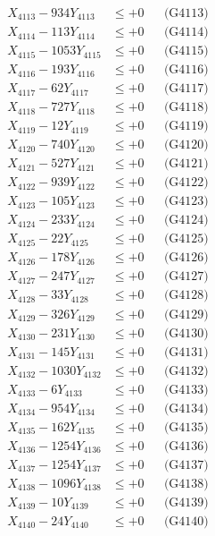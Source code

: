 \documentclass[a4paper,10pt]{article}
\begin{document}
{\begin{align}
X_{4113} - 934Y_{4113} &\leq +0 && \text{(G4113)} \\
X_{4114} - 113Y_{4114} &\leq +0 && \text{(G4114)} \\
X_{4115} - 1053Y_{4115} &\leq +0 && \text{(G4115)} \\
X_{4116} - 193Y_{4116} &\leq +0 && \text{(G4116)} \\
X_{4117} - 62Y_{4117} &\leq +0 && \text{(G4117)} \\
X_{4118} - 727Y_{4118} &\leq +0 && \text{(G4118)} \\
X_{4119} - 12Y_{4119} &\leq +0 && \text{(G4119)} \\
X_{4120} - 740Y_{4120} &\leq +0 && \text{(G4120)} \\
\allowbreak
X_{4121} - 527Y_{4121} &\leq +0 && \text{(G4121)} \\
X_{4122} - 939Y_{4122} &\leq +0 && \text{(G4122)} \\
X_{4123} - 105Y_{4123} &\leq +0 && \text{(G4123)} \\
X_{4124} - 233Y_{4124} &\leq +0 && \text{(G4124)} \\
X_{4125} - 22Y_{4125} &\leq +0 && \text{(G4125)} \\
X_{4126} - 178Y_{4126} &\leq +0 && \text{(G4126)} \\
X_{4127} - 247Y_{4127} &\leq +0 && \text{(G4127)} \\
X_{4128} - 33Y_{4128} &\leq +0 && \text{(G4128)} \\
X_{4129} - 326Y_{4129} &\leq +0 && \text{(G4129)} \\
X_{4130} - 231Y_{4130} &\leq +0 && \text{(G4130)} \\
\allowbreak
X_{4131} - 145Y_{4131} &\leq +0 && \text{(G4131)} \\
X_{4132} - 1030Y_{4132} &\leq +0 && \text{(G4132)} \\
X_{4133} - 6Y_{4133} &\leq +0 && \text{(G4133)} \\
X_{4134} - 954Y_{4134} &\leq +0 && \text{(G4134)} \\
X_{4135} - 162Y_{4135} &\leq +0 && \text{(G4135)} \\
X_{4136} - 1254Y_{4136} &\leq +0 && \text{(G4136)} \\
X_{4137} - 1254Y_{4137} &\leq +0 && \text{(G4137)} \\
X_{4138} - 1096Y_{4138} &\leq +0 && \text{(G4138)} \\
X_{4139} - 10Y_{4139} &\leq +0 && \text{(G4139)} \\
X_{4140} - 24Y_{4140} &\leq +0 && \text{(G4140)} \\

\end{align}}
\end{document}
